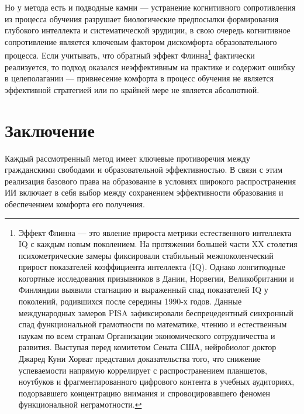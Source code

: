 \documentclass[12pt,a4paper]{article}
\begin{document}
Но у 
метода есть и подводные камни — устранение когнитивного сопротивления из процесса 
обучения разрушает биологические предпосылки формирования глубокого интеллекта и 
систематической эрудиции, в свою очередь когнитивное сопротивление является 
ключевым фактором дискомфорта образовательного
процесса. Если учитывать, что обратный эффект Флинна\footnote{Эффект Флинна — это 
явление прироста метрики естественного интеллекта IQ с каждым новым поколением. 
На протяжении большей части XX столетия психометрические замеры фиксировали 
стабильный межпоколенческий прирост показателей коэффициента интеллекта (IQ). 
Однако лонгитюдные когортные исследования призывников в Дании, Норвегии, 
Великобритании и Финляндии выявили стагнацию и выраженный спад показателей IQ у 
поколений, родившихся после середины 1990-х годов. Данные международных замеров 
PISA зафиксировали беспрецедентный синхронный спад функциональной грамотности по 
математике, чтению и естественным наукам по всем странам Организации 
экономического сотрудничества и развития. Выступая перед комитетом Сената США, 
нейробиолог доктор Джаред Куни Хорват представил доказательства того, что снижение 
успеваемости напрямую коррелирует с распространением планшетов, ноутбуков и 
фрагментированного цифрового контента в учебных аудиториях, подорвавшего 
концентрацию внимания и спровоцировавшего феномен функциональной неграмотности.} 
фактически реализуется, то подход оказался неэффективным на практике и содержит 
ошибку в целеполагании — привнесение комфорта в процесс обучения не является 
эффективной стратегией или по крайней мере не является абсолютной.

\section{Заключение}

Каждый рассмотренный метод имеет ключевые противоречия между гражданскими свободами 
и образовательной эффективностью. В связи с этим реализация базового права на 
образование в условиях широкого распространения ИИ включает в себя выбор между 
сохранением эффективности образования и обеспечением комфорта его получения.
\end{document}
